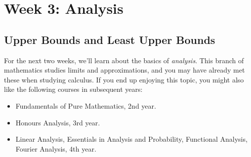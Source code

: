 \documentclass[11pt,dvipsnames]{book}
\numberwithin{equation}{section} %
\numberwithin{figure}{section} %
\numberwithin{table}{section} %
\begin{document}




\pagestyle{empty} %

 \tableofcontents %

\cleardoublepage %

\pagestyle{fancy} %


\setcounter{part}{2}

\part{Week 3: Analysis}




\setcounter{chapter}{4}

\chapter{Upper Bounds and Least Upper Bounds}

\setcounter{page}{1}




For the next two weeks, we'll learn about the basics of {\it analysis}. This branch of mathematics studies limits and approximations, and you may have already met these when studying calculus. If you end up enjoying this topic, you might also like the following courses in subsequent years:

\begin{itemize}
\item Fundamentals of Pure Mathematics, 2nd year. 
\item Honours Analysis, 3rd year.
\item Linear Analysis, Essentials in Analysis and Probability, Functional Analysis, Fourier Analysis, 4th year.
\end{itemize}
\end{document}
